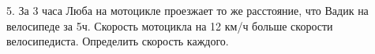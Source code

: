 5. За 3 часа Люба на мотоцикле проезжает то же расстояние,  что Вадик на велосипеде за 5ч. Скорость мотоцикла на 12 км/ч больше скорости велосипедиста. Определить скорость каждого.\\
